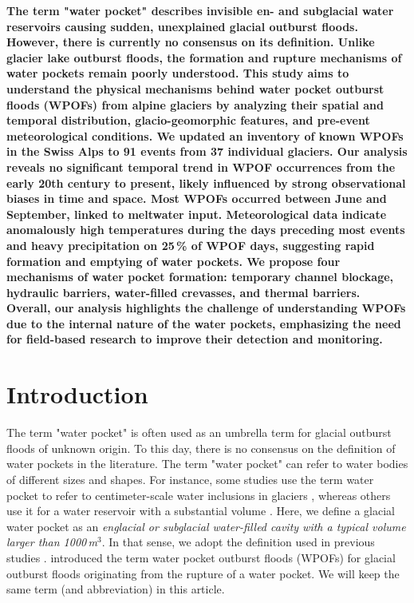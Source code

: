 \textbf{The term "water pocket" describes invisible en- and subglacial water reservoirs causing sudden, unexplained glacial outburst floods. However, there is currently no consensus on its definition. Unlike glacier lake outburst floods, the formation and rupture mechanisms of water pockets remain poorly understood. This study aims to understand the physical mechanisms behind water pocket outburst floods (WPOFs) from alpine glaciers by analyzing their spatial and temporal distribution, glacio-geomorphic features, and pre-event meteorological conditions. We updated an inventory of known WPOFs in the Swiss Alps to 91 events from 37 individual glaciers. Our analysis reveals no significant temporal trend in WPOF occurrences from the early 20th century to present, likely influenced by strong observational biases in time and space. Most WPOFs occurred between June and September, linked to meltwater input. Meteorological data indicate anomalously high temperatures during the days preceding most events and heavy precipitation on 25\,\% of WPOF days, suggesting rapid formation and emptying of water pockets. We propose four mechanisms of water pocket formation: temporary channel blockage, hydraulic barriers, water-filled crevasses, and thermal barriers. Overall, our analysis highlights the challenge of understanding WPOFs due to the internal nature of the water pockets, emphasizing the need for field-based research to improve their detection and monitoring.}



\section{ Introduction}

The term "water pocket" is often used as an umbrella term for glacial outburst floods of unknown origin. To this day, there is no consensus on the definition of water pockets in the literature. The term "water pocket" can refer to water bodies of different sizes and shapes. For instance, some studies use the term water pocket to refer to centimeter-scale water inclusions in glaciers \citep[]{Vivian&Bocquet1973,Raymond&Harrison1975,Holmlund1988,Fountain&Walder1998,Murray&al2000b}, whereas others use it for a water reservoir with a substantial volume \citep[]{Beecroft1983, Haeberli&al1989,Tweed&Russel1999,Vincent&al2010b}. Here, we define a glacial water pocket as an {\it englacial or subglacial water-filled cavity with a typical volume larger than 1000\,m$^3$}. In that sense, we adopt the definition used in previous studies \citep[]{Haeberli&al1989,Deline&al2004,Roberts2005, Vincent&al2010b}. \cite{Deline&al2004} introduced the term water pocket outburst floods (WPOFs) for glacial outburst floods originating from the rupture of a water pocket. We will keep the same term (and abbreviation) in this article.



